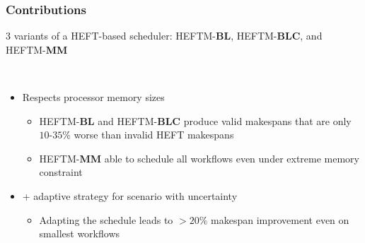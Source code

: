 \documentclass[xcolor=svgnames,titlepage,english,presentation]{beamer}
\begin{document}
\begin{frame}[t]
\begin{columns}
{\begin{figure}
        \end{figure}
    }
   
\end{columns}
   


\end{frame}


\begin{frame}[t]
    \frametitle{Contributions}

    3 variants of a HEFT-based scheduler: HEFTM-\textbf{BL}, HEFTM-\textbf{BLC}, and HEFTM-\textbf{MM}

    \pause
    ~~~~~~~~~~~~~~~~~

    
    \begin{itemize}
        \item Respects processor memory sizes
        \begin{itemize}
            \item HEFTM-\textbf{BL} and HEFTM-\textbf{BLC} produce valid makespans that are only $10$-$35\%$ worse than invalid HEFT makespans
            \item HEFTM-\textbf{MM} able to schedule all workflows even under extreme memory constraint
        \end{itemize}

        \pause

        \item + adaptive strategy for scenario with uncertainty          

        \begin{itemize}
            \item Adapting the schedule leads to $>20\%$ makespan improvement even on smallest workflows
        \end{itemize}
    
    \end{itemize}

    
    

\end{frame}
\end{document}
